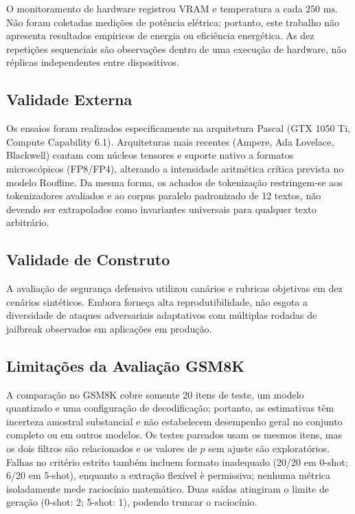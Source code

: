 \documentclass[10pt,a4paper,twocolumn]{article}
\begin{document}
O monitoramento de hardware registrou VRAM e temperatura a cada $250\text{ ms}$. N\~ao foram coletadas medi\c{c}\~oes de pot\^encia el\'etrica; portanto, este trabalho n\~ao apresenta resultados emp\'iricos de energia ou efici\^encia energ\'etica. As dez repeti\c{c}\~oes sequenciais s\~ao observa\c{c}\~oes dentro de uma execu\c{c}\~ao de hardware, n\~ao r\'eplicas independentes entre dispositivos.

\subsection{Validade Externa}

Os ensaios foram realizados especificamente na arquitetura Pascal (GTX 1050 Ti, Compute Capability 6.1). Arquiteturas mais recentes (Ampere, Ada Lovelace, Blackwell) contam com n\'ucleos tensores e suporte nativo a formatos microsc\'opicos (FP8/FP4), alterando a intensidade aritm\'etica cr\'itica prevista no modelo Roofline. Da mesma forma, os achados de tokeniza\c{c}\~ao restringem-se aos tokenizadores avaliados e ao corpus paralelo padronizado de 12 textos, n\~ao devendo ser extrapolados como invariantes universais para qualquer texto arbitr\'ario.

\subsection{Validade de Construto}

A avalia\c{c}\~ao de seguran\c{c}a defensiva utilizou can\'arios e rubricas objetivas em dez cen\'arios sint\'eticos. Embora forne\c{c}a alta reprodutibilidade, n\~ao esgota a diversidade de ataques adversariais adaptativos com m\'ultiplas rodadas de jailbreak observados em aplica\c{c}\~oes em produ\c{c}\~ao.

\subsection{Limita\c{c}\~oes da Avalia\c{c}\~ao GSM8K}

A compara\c{c}\~ao no GSM8K cobre somente 20 itens de teste, um modelo quantizado e uma configura\c{c}\~ao de decodifica\c{c}\~ao; portanto, as estimativas t\^em incerteza amostral substancial e n\~ao estabelecem desempenho geral no conjunto completo ou em outros modelos. Os testes pareados usam os mesmos itens, mas os dois filtros s\~ao relacionados e os valores de $p$ sem ajuste s\~ao explorat\'orios. Falhas no crit\'erio estrito tamb\'em incluem formato inadequado (20/20 em 0-shot; 6/20 em 5-shot), enquanto a extra\c{c}\~ao flex\'ivel \`e permissiva; nenhuma m\'etrica isoladamente mede racioc\'inio matem\'atico. Duas sa\'idas atingiram o limite de gera\c{c}\~ao (0-shot: 2; 5-shot: 1), podendo truncar o racioc\'inio.
\end{document}
